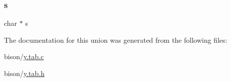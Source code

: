 \subsubsection{\texorpdfstring{s}{s}}
{\footnotesize\ttfamily char $\ast$ s}



The documentation for this union was generated from the following files\+:\begin{DoxyCompactItemize}
\item 
bison/\hyperlink{y_8tab_8c}{y.\+tab.\+c}\item 
bison/\hyperlink{y_8tab_8h}{y.\+tab.\+h}\end{DoxyCompactItemize}
